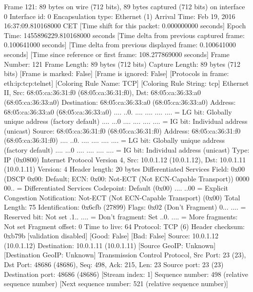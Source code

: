 Frame 121: 89 bytes on wire (712 bits), 89 bytes captured (712 bits) on interface 0
    Interface id: 0
    Encapsulation type: Ethernet (1)
    Arrival Time: Feb 19, 2016 16:37:09.810168000 CET
    [Time shift for this packet: 0.000000000 seconds]
    Epoch Time: 1455896229.810168000 seconds
    [Time delta from previous captured frame: 0.100641000 seconds]
    [Time delta from previous displayed frame: 0.100641000 seconds]
    [Time since reference or first frame: 108.277869000 seconds]
    Frame Number: 121
    Frame Length: 89 bytes (712 bits)
    Capture Length: 89 bytes (712 bits)
    [Frame is marked: False]
    [Frame is ignored: False]
    [Protocols in frame: eth:ip:tcp:telnet]
    [Coloring Rule Name: TCP]
    [Coloring Rule String: tcp]
Ethernet II, Src: 68:05:ca:36:31:f0 (68:05:ca:36:31:f0), Dst: 68:05:ca:36:33:a0 (68:05:ca:36:33:a0)
    Destination: 68:05:ca:36:33:a0 (68:05:ca:36:33:a0)
        Address: 68:05:ca:36:33:a0 (68:05:ca:36:33:a0)
        .... ..0. .... .... .... .... = LG bit: Globally unique address (factory default)
        .... ...0 .... .... .... .... = IG bit: Individual address (unicast)
    Source: 68:05:ca:36:31:f0 (68:05:ca:36:31:f0)
        Address: 68:05:ca:36:31:f0 (68:05:ca:36:31:f0)
        .... ..0. .... .... .... .... = LG bit: Globally unique address (factory default)
        .... ...0 .... .... .... .... = IG bit: Individual address (unicast)
    Type: IP (0x0800)
Internet Protocol Version 4, Src: 10.0.1.12 (10.0.1.12), Dst: 10.0.1.11 (10.0.1.11)
    Version: 4
    Header length: 20 bytes
    Differentiated Services Field: 0x00 (DSCP 0x00: Default; ECN: 0x00: Not-ECT (Not ECN-Capable Transport))
        0000 00.. = Differentiated Services Codepoint: Default (0x00)
        .... ..00 = Explicit Congestion Notification: Not-ECT (Not ECN-Capable Transport) (0x00)
    Total Length: 75
    Identification: 0x6cfb (27899)
    Flags: 0x02 (Don't Fragment)
        0... .... = Reserved bit: Not set
        .1.. .... = Don't fragment: Set
        ..0. .... = More fragments: Not set
    Fragment offset: 0
    Time to live: 64
    Protocol: TCP (6)
    Header checksum: 0xb79b [validation disabled]
        [Good: False]
        [Bad: False]
    Source: 10.0.1.12 (10.0.1.12)
    Destination: 10.0.1.11 (10.0.1.11)
    [Source GeoIP: Unknown]
    [Destination GeoIP: Unknown]
Transmission Control Protocol, Src Port: 23 (23), Dst Port: 48686 (48686), Seq: 498, Ack: 215, Len: 23
    Source port: 23 (23)
    Destination port: 48686 (48686)
    [Stream index: 1]
    Sequence number: 498    (relative sequence number)
    [Next sequence number: 521    (relative sequence number)]
